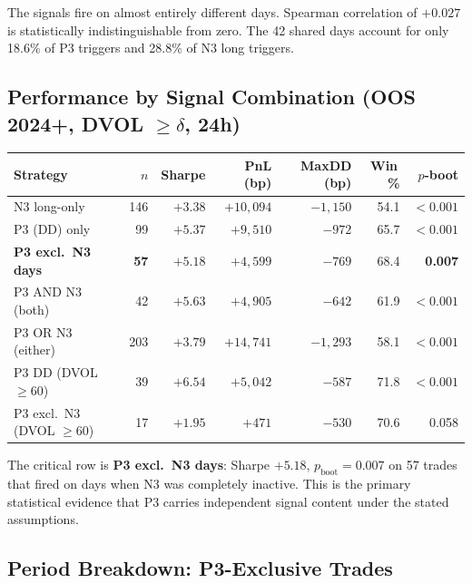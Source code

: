 \documentclass[12pt, a4paper]{article}
\theoremstyle{plain}
\theoremstyle{definition}
\begin{document}
The signals fire on almost entirely different days.  Spearman correlation
of $+0.027$ is statistically indistinguishable from zero.  The 42 shared
days account for only 18.6\% of P3 triggers and 28.8\% of N3 long triggers.

\subsection{Performance by Signal Combination (OOS 2024+, DVOL $\geq \delta$, 24h)}

\begin{center}
\begin{tabular}{lrrrrrr}
\toprule
Strategy & $n$ & Sharpe & PnL (bp) & MaxDD (bp) & Win\,\% & $p$-boot \\
\midrule
N3 long-only         & 146 & $+3.38$ & $+10{,}094$ & $-1{,}150$ & 54.1 & $<0.001$ \\
P3 (DD) only         &  99 & $+5.37$ & $+9{,}510$  & $-972$     & 65.7 & $<0.001$ \\
\textbf{P3 excl.\ N3 days} & \textbf{57} & $\mathbf{+5.18}$ & $+4{,}599$ & $-769$ & 68.4 & \textbf{0.007} \\
P3 AND N3 (both)     &  42 & $+5.63$ & $+4{,}905$  & $-642$     & 61.9 & $<0.001$ \\
P3 OR N3 (either)    & 203 & $+3.79$ & $+14{,}741$ & $-1{,}293$ & 58.1 & $<0.001$ \\
\midrule
P3 DD (DVOL $\geq 60$)       &  39 & $+6.54$ & $+5{,}042$ & $-587$ & 71.8 & $<0.001$ \\
P3 excl.\ N3 (DVOL $\geq 60$) &  17 & $+1.95$ & $+471$     & $-530$ & 70.6 & 0.058   \\
\bottomrule
\end{tabular}
\end{center}

The critical row is \textbf{P3 excl.\ N3 days}: Sharpe $+5.18$,
$p_{\mathrm{boot}} = 0.007$ on 57 trades that fired on days when N3
was completely inactive.  This is the primary statistical evidence that P3 carries
independent signal content under the stated assumptions.

\subsection{Period Breakdown: P3-Exclusive Trades}
\end{document}
